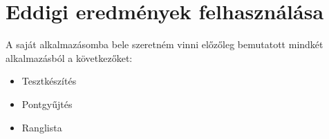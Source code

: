 \section{Eddigi eredmények felhasználása}
A saját alkalmazásomba bele szeretném vinni előzőleg bemutatott mindkét alkalmazásból a következőket:

\begin{itemize}
  \item {Tesztkészítés}
  \item {Pontgyűjtés}
  \item {Ranglista}
\end{itemize}